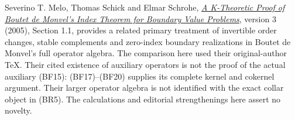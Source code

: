 \documentclass[
  11pt,
]{article}
\begin{document}
Severino T. Melo, Thomas Schick and Elmar Schrohe,
\href{https://arxiv.org/abs/math/0403059v3}{\emph{A K-Theoretic Proof of
Boutet de Monvel's Index Theorem for Boundary Value Problems}}, version
3 (2005), Section 1.1, provides a related primary treatment of
invertible order changes, stable complements and zero-index boundary
realizations in Boutet de Monvel's full operator algebra. The comparison
here used their original-author TeX. Their cited existence of auxiliary
operators is not the proof of the actual auxiliary (BF15):
(BF17)--(BF20) supplies its complete kernel and cokernel argument. Their
larger operator algebra is not identified with the exact collar object
in (BR5). The calculations and editorial strengthenings here assert no
novelty.
\end{document}
